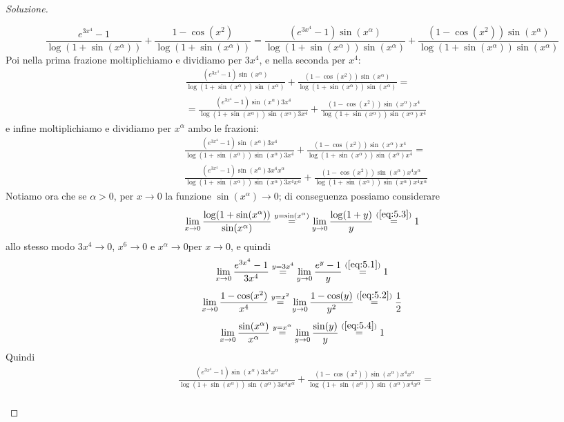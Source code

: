 \begin{proof}[Soluzione]
\begin{enumerate}[(i)]
\[        \frac{e^{3x^4}-1}{\log(1+\sin(x^\alpha))}+\frac{1-\cos(x^2)}{\log(1+\sin(x^\alpha))} = \frac{(e^{3x^4}-1)\sin(x^\alpha)}{\log(1+\sin(x^\alpha))\sin(x^\alpha)}+\frac{(1-\cos(x^2))\sin(x^\alpha)}{\log(1+\sin(x^\alpha))\sin(x^\alpha)}
        \]
        Poi nella prima frazione moltiplichiamo e dividiamo per $3x^4$, e nella seconda per $x^4$:
        \[
        \begin{split}
           & \frac{(e^{3x^4}-1)\sin(x^\alpha)}{\log(1+\sin(x^\alpha))\sin(x^\alpha)}+\frac{(1-\cos(x^2))\sin(x^\alpha)}{\log(1+\sin(x^\alpha))\sin(x^\alpha)} = \\
            & = \frac{(e^{3x^4}-1)\sin(x^\alpha)3x^4}{\log(1+\sin(x^\alpha))\sin(x^\alpha)3x^4}+\frac{(1-\cos(x^2))\sin(x^\alpha)x^4}{\log(1+\sin(x^\alpha))\sin(x^\alpha)x^4}
        \end{split}
        \]
        e infine moltiplichiamo e dividiamo per $x^\alpha$ ambo le frazioni:
        \[
        \begin{split}
            & \frac{(e^{3x^4}-1)\sin(x^\alpha)3x^4}{\log(1+\sin(x^\alpha))\sin(x^\alpha)3x^4}+\frac{(1-\cos(x^2))\sin(x^\alpha)x^4}{\log(1+\sin(x^\alpha))\sin(x^\alpha)x^4} = \\
            & \frac{(e^{3x^4}-1)\sin(x^\alpha)3x^{4}x^\alpha}{\log(1+\sin(x^\alpha))\sin(x^\alpha)3x^4 x^\alpha}+\frac{(1-\cos(x^2))\sin(x^\alpha)x^4x^\alpha}{\log(1+\sin(x^\alpha))\sin(x^\alpha)x^4x^\alpha}
        \end{split}
        \]
        Notiamo ora che se $\alpha>0$, per $x\to 0$ la funzione $\sin(x^\alpha)\to 0$; di conseguenza possiamo considerare
        \[
        \lim_{x\to 0} \frac{\log(1+\sin(x^\alpha))}{\sin(x^\alpha)} \overset{y = \sin(x^\alpha)}{=} \lim_{y\to 0} \frac{\log(1+y)}{y} \overset{(\ref{eq:5.3})}{=} 1
        \]
        allo stesso modo $3x^4\to 0$, $x^6\to 0$ e $x^\alpha\to0$per $x\to 0$, e quindi
        \[
        \lim_{x\to 0} \frac{e^{3x^4}-1}{3x^4} \overset{y = 3x^4}{=} \lim_{y\to 0} \frac{e^y-1}{y}\overset{(\ref{eq:5.1})}{=} 1
        \]
        \[
        \lim_{x\to 0} \frac{1-\cos(x^2)}{x^4} \overset{y = x^2}{=} \lim_{y\to 0} \frac{1-\cos(y)}{y^2} \overset{(\ref{eq:5.2})}{=} \frac{1}{2}
        \]
        \[
        \lim_{x\to 0} \frac{\sin(x^\alpha)}{x^\alpha} \overset{y = x^\alpha}{=} \lim_{y\to 0} \frac{\sin(y)}{y} \overset{(\ref{eq:5.4})}{=} 1
        \]
        Quindi
        \[
        \begin{split}
            & \frac{(e^{3x^4}-1)\sin(x^\alpha)3x^4x^\alpha}{\log(1+\sin(x^\alpha))\sin(x^\alpha)3x^4x^\alpha}+\frac{(1-\cos(x^2))\sin(x^\alpha)x^4x^\alpha}{\log(1+\sin(x^\alpha))\sin(x^\alpha)x^4x^\alpha} = \\

\end{split}\]
\end{enumerate}
\end{proof}
